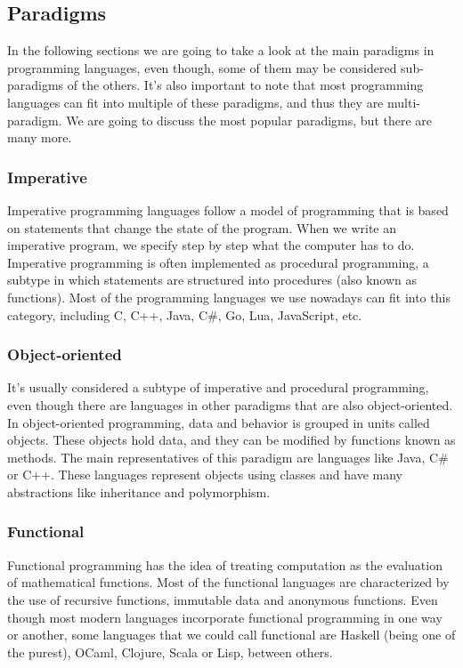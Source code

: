 ﻿\documentclass[10pt,a4paper,twocolumn,twoside]{article}
\begin{document}
\subsection{Paradigms}
In the following sections we are going to take a look at the main paradigms in
programming languages, even though, some of them may be considered sub-paradigms
of the others. It's also important to note that most programming languages can
fit into multiple of these paradigms, and thus they are multi-paradigm. We are
going to discuss the most popular paradigms, but there are many more.

\subsubsection{Imperative}
Imperative programming languages follow a model of programming that is based on
statements that change the state of the program. When we write an imperative 
program, we specify step by step what the computer has to do. Imperative 
programming is often implemented as procedural programming, a subtype in which
statements are structured into procedures (also known as functions). Most of
the programming languages we use nowadays can fit into this category, including
C, C++, Java, C\#, Go, Lua, JavaScript, etc.

\subsubsection{Object-oriented}
It's usually considered a subtype of imperative and procedural programming, even
though there are languages in other paradigms that are also object-oriented. In
object-oriented programming, data and behavior is grouped in units called
objects. These objects hold data, and they can be modified by functions known as
methods. The main representatives of this paradigm are languages like Java, C\#
or C++. These languages represent objects using classes and have many
abstractions like inheritance and polymorphism.

\subsubsection{Functional}
Functional programming has the idea of treating computation as the evaluation of
mathematical functions. Most of the functional languages are characterized by
the use of recursive functions, immutable data and anonymous functions. Even
though most modern languages incorporate functional programming in one way or
another, some languages that we could call functional are Haskell (being one of
the purest), OCaml, Clojure, Scala or Lisp, between others.
\end{document}
